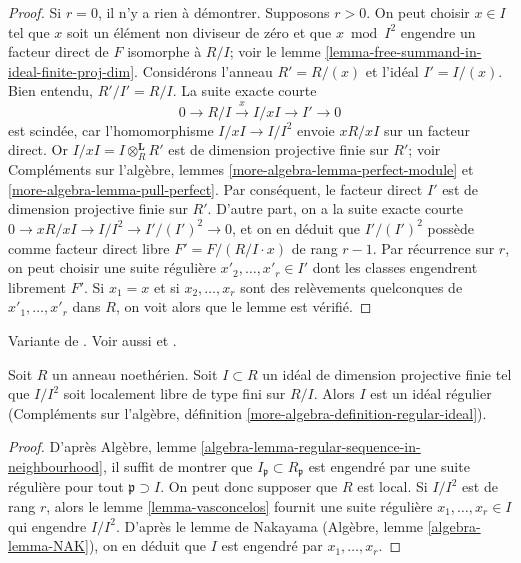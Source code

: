 \begin{proof}
Si $r = 0$, il n'y a rien à démontrer. Supposons $r > 0$. On peut choisir
$x \in I$ tel que $x$ soit un élément non diviseur de zéro et que $x \bmod I^2$
engendre un facteur direct de $F$ isomorphe à $R/I$; voir
le lemme \ref{lemma-free-summand-in-ideal-finite-proj-dim}.
Considérons l'anneau $R' = R/(x)$ et l'idéal $I' = I/(x)$.
Bien entendu, $R'/I' = R/I$. La suite exacte courte
$$
0 \to R/I \xrightarrow{x} I/xI \to I' \to 0
$$
est scindée, car l'homomorphisme $I/xI \to I/I^2$ envoie $xR/xI$
sur un facteur direct. Or $I/xI = I \otimes_R^\mathbf{L} R'$ est
de dimension projective finie sur $R'$; voir
Compléments sur l'algèbre, lemmes \ref{more-algebra-lemma-perfect-module} et
\ref{more-algebra-lemma-pull-perfect}. Par
conséquent, le facteur direct $I'$ est de dimension projective finie sur $R'$.
D'autre part, on a la suite exacte courte
$0 \to xR/xI \to I/I^2 \to I'/(I')^2 \to 0$, et on en déduit que
$I'/(I')^2$ possède comme facteur direct libre $F' = F/(R/I \cdot x)$
de rang $r - 1$. Par récurrence sur $r$, on
peut choisir une suite régulière $x'_2, \ldots, x'_r \in I'$
dont les classes engendrent librement $F'$.
Si $x_1 = x$ et si $x_2, \ldots, x_r$ sont des relèvements quelconques de
$x'_1, \ldots, x'_r$ dans $R$, on voit alors que le lemme est vérifié.
\end{proof}

\begin{proposition}
\label{proposition-regular-ideal}
\begin{reference}
Variante de \cite[Corollary 1]{Vasconcelos}. Voir aussi
\cite{Iyengar} et \cite{Ferrand-lci}.
\end{reference}
Soit $R$ un anneau noethérien. Soit $I \subset R$ un idéal
de dimension projective finie tel que $I/I^2$ soit
localement libre de type fini sur $R/I$. Alors $I$ est un idéal régulier
(Compléments sur l'algèbre, définition \ref{more-algebra-definition-regular-ideal}).
\end{proposition}

\begin{proof}
D'après Algèbre, lemme \ref{algebra-lemma-regular-sequence-in-neighbourhood},
il suffit de montrer que $I_\mathfrak p \subset R_\mathfrak p$ est engendré
par une suite régulière pour tout $\mathfrak p \supset I$. On peut donc
supposer que $R$ est local. Si $I/I^2$ est de rang $r$, alors le
lemme \ref{lemma-vasconcelos} fournit une suite régulière
$x_1, \ldots, x_r \in I$ qui engendre $I/I^2$.
D'après le lemme de Nakayama (Algèbre, lemme \ref{algebra-lemma-NAK}),
on en déduit que $I$ est engendré par $x_1, \ldots, x_r$.
\end{proof}

